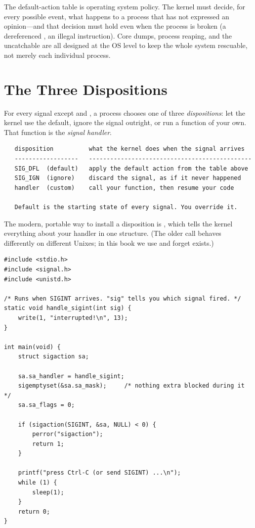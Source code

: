 \begin{osconcept}
The default-action table is operating system policy. The kernel must
decide, for every possible event, what happens to a process that has
not expressed an opinion---and that decision must hold even when the
process is broken (a dereferenced , an illegal instruction).
Core dumps, process reaping, and the uncatchable  are all
designed at the OS level to keep the whole system rescuable, not merely
each individual process.
\end{osconcept}

\section{The Three Dispositions}

For every signal except  and , a process
chooses one of three \emph{dispositions}: let the kernel use the
default, ignore the signal outright, or run a function of your own.
That function is the \emph{signal handler}.

\begin{verbatim}
   disposition          what the kernel does when the signal arrives
   ------------------   ----------------------------------------------
   SIG_DFL  (default)   apply the default action from the table above
   SIG_IGN  (ignore)    discard the signal, as if it never happened
   handler  (custom)    call your function, then resume your code

   Default is the starting state of every signal. You override it.
\end{verbatim}

The modern, portable way to install a disposition is
, which tells the kernel everything about your handler
in one structure. (The older  call behaves differently on
different Unixes; in this book we use  and forget
 exists.)

\begin{lstlisting}[caption={Installing a handler with sigaction.}]
#include <stdio.h>
#include <signal.h>
#include <unistd.h>

/* Runs when SIGINT arrives. "sig" tells you which signal fired. */
static void handle_sigint(int sig) {
    write(1, "interrupted!\n", 13);
}

int main(void) {
    struct sigaction sa;

    sa.sa_handler = handle_sigint;
    sigemptyset(&sa.sa_mask);     /* nothing extra blocked during it */
    sa.sa_flags = 0;

    if (sigaction(SIGINT, &sa, NULL) < 0) {
        perror("sigaction");
        return 1;
    }

    printf("press Ctrl-C (or send SIGINT) ...\n");
    while (1) {
        sleep(1);
    }
    return 0;
}
\end{lstlisting}

